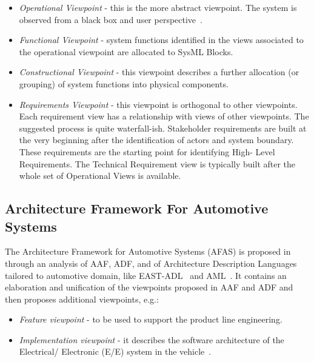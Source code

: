 \begin{itemize}
\item {\em Operational Viewpoint} - this is the more abstract viewpoint. %
The system is observed from a black box and user perspective~\cite{AFRenault}.
\item {\em Functional  Viewpoint} - system functions %
identified in the views associated to the operational viewpoint %
are allocated to SysML Blocks. 
\item {\em Constructional Viewpoint} - this viewpoint %
describes a further allocation (or grouping) of system functions into physical components.
\item {\em Requirements Viewpoint} - this viewpoint is orthogonal to other viewpoints. Each requirement view has a relationship with views of
other viewpoints. The suggested process is quite waterfall-ish. Stakeholder requirements are built
at the very beginning after the identification of actors and system boundary. These requirements are the starting point for identifying High-
Level Requirements. The Technical Requirement view is typically built 
after the whole set of Operational Views is available.
\end{itemize}

\subsection{Architecture Framework For Automotive Systems}
The Architecture Framework for Automotive Systems (AFAS) is proposed in~\cite{Yania} through an analysis of AAF, ADF, and of Architecture Description Languages~\cite{whatindustrywants,ADL_Neno00} tailored to automotive domain, like EAST-ADL~\cite{EAST-ADL} %
and AML~\cite{AML}. 
It contains an elaboration and unification of the viewpoints proposed in AAF and ADF and then proposes additional viewpoints, e.g.:

\begin{itemize}
\item {\em Feature viewpoint} - to be used to support the product line engineering. %
\item {\em Implementation viewpoint} - 
it describes the software architecture of the Electrical/ Electronic (E/E) system in the vehicle~\cite{EAST-ADL}. %
\end{itemize}


